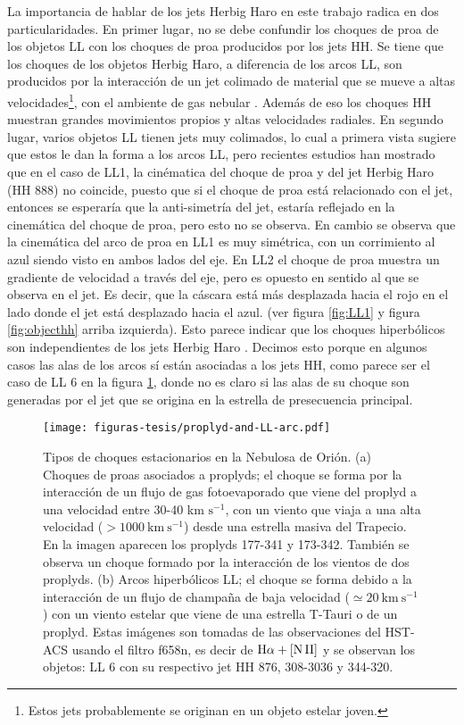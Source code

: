 La importancia de hablar de los jets Herbig Haro en este trabajo radica en dos particularidades. En primer lugar, no se debe confundir los choques de proa de los objetos LL con los choques de proa producidos por los jets HH. Se tiene que los choques de los objetos Herbig Haro, a diferencia de los arcos LL, son producidos por la interacción de un jet colimado de material que se mueve a altas velocidades\footnote{Estos jets probablemente se originan en un objeto estelar joven.}, con el ambiente de gas nebular \citep{Odell:1994}. Además de eso los choques HH muestran grandes movimientos propios y altas velocidades radiales. En segundo lugar, varios objetos LL tienen jets muy colimados, lo cual a primera vista sugiere que estos le dan la forma a los arcos LL, pero recientes estudios han mostrado que en el caso de LL1, la cinématica del choque de proa y del jet Herbig Haro (HH 888) no coincide, puesto que si el choque de proa está relacionado con el jet, entonces se esperaría que la anti-simetría del jet, estaría reflejado en la cinemática del choque de proa, pero esto no se observa. En cambio se observa que la cinemática del arco de proa en LL1 es muy simétrica, con un corrimiento al azul siendo visto en ambos lados del eje. En LL2 el choque de proa muestra un gradiente de velocidad a través del eje, pero es opuesto en sentido al que se observa en el jet. Es decir, que la cáscara está más desplazada hacia el rojo en el lado donde el jet está desplazado hacia el azul. (ver figura \ref{fig:LL1} y figura \ref{fig:objecthh} arriba izquierda). Esto parece indicar que los choques hiperbólicos son independientes de los jets Herbig Haro \citep{Henney:2013a}. Decimos esto porque en algunos casos las alas de los arcos sí están asociadas a los jets HH, como parece ser el caso de LL 6 en la figura \ref{fig:proplydbow-objetoll}, donde no es claro si las alas de su choque son generadas por el jet que se origina en la estrella de presecuencia principal.


\begin{figure}
  \centering
  \texttt{[image: figuras-tesis/proplyd-and-LL-arc.pdf]}
  \caption{Tipos de choques estacionarios en la Nebulosa de Orión. (a) Choques de proas asociados a proplyds; el choque se forma por la interacción de un flujo de gas fotoevaporado que viene del proplyd a una velocidad entre 30-40 km \(\text{s}^{-1}\), con un viento que viaja a una alta velocidad (\(>1000 ~\text{km} ~\text{s}^{-1}\)) desde una estrella masiva del Trapecio. En la imagen aparecen los proplyds 177-341 y 173-342. También se observa un choque formado por la interacción de los vientos de dos proplyds. (b) Arcos hiperbólicos LL; el choque se forma debido a la interacción de un flujo de champaña de baja velocidad (\(\simeq 20~\text{km} ~\text{s}^{-1}\)) con un viento estelar que viene de una estrella T-Tauri o de un proplyd. Estas imágenes son tomadas de las observaciones del HST-ACS usando el filtro f658n, es decir de \(\mathrm{H}\alpha + \mathrm{[N\,II]}\) y se observan los objetos: LL 6 con su respectivo jet HH 876, 308-3036 y 344-320. }
  \label{fig:proplydbow-objetoll}
\end{figure}


